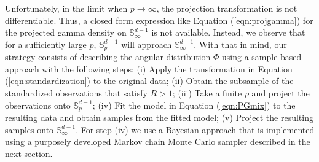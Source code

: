 Unfortunately, in the limit when $p\rightarrow \infty$, the projection 
  transformation is not differentiable. Thus, a closed form expression 
  like Equation (\ref{eqn:projgamma}) for the projected gamma density on ${\mathbb S}_\infty^{d-1}$ is not 
  available. Instead, we observe that for a sufficiently large $p$, $\mathbb{S}_p^{d-1}$ will approach
  $\mathbb{S}_{\infty}^{d-1}$.  With that in mind, our strategy consists of describing the angular
  distribution $\Phi$ using a sample based approach with the following steps: (i) Apply the 
  transformation in Equation (\ref{eqn:standardization}) to the original data; (ii) Obtain the 
  subsample of the standardized observations that satisfy $R>1$; (iii) Take a finite $p$ and 
  project the observations onto ${\mathbb S}_p^{d-1}$; 
  (iv) Fit the model in Equation (\ref{eqn:PGmix}) to the resulting 
  data and obtain samples from the fitted model; 
  (v) Project the resulting samples onto ${\mathbb S}_\infty^{d-1}$.
  For step (iv) we use a Bayesian approach that is implemented using a purposely 
  developed Markov chain Monte Carlo sampler described in the next section.

